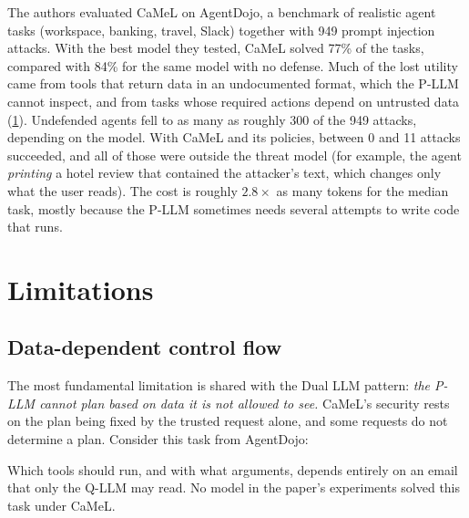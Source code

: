 The authors evaluated CaMeL on AgentDojo, a benchmark of realistic agent
tasks (workspace, banking, travel, Slack) together with 949 prompt
injection attacks.\autocite{debenedetti2024agentdojo}
With the best model they tested, CaMeL solved 77\% of the tasks,
compared with 84\% for the same model with no defense.
Much of the lost utility came from tools that return data in an
undocumented format, which the P-LLM cannot inspect, and from tasks
whose required actions depend on untrusted data
(\cref{sec:camel:limits}).
Undefended agents fell to as many as roughly 300 of the 949 attacks,
depending on the model.
With CaMeL and its policies, between 0 and 11 attacks succeeded, and all
of those were outside the threat model (for example, the agent
\emph{printing} a hotel review that contained the attacker's text, which
changes only what the user reads).
The cost is roughly $2.8\times$ as many tokens for the median task,
mostly because the P-LLM sometimes needs several attempts to write code
that runs.

\section{Limitations}
\label{sec:camel:limits}

\subsection{Data-dependent control flow}

The most fundamental limitation is shared with the Dual LLM pattern:
\emph{the P-LLM cannot plan based on data it is not allowed to see.}
CaMeL's security rests on the plan being fixed by the trusted request
alone, and some requests do not determine a plan.
Consider this task from AgentDojo:
\begin{quote}
\end{quote}
Which tools should run, and with what arguments, depends entirely on an
email that only the Q-LLM may read.
No model in the paper's experiments solved this task under CaMeL.


